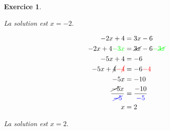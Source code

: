 \documentclass[10pt]{article}
\newtheorem{exo}{Exercice}
\begin{document}
\begin{exo}
\begin{multicols}{5}
La solution est $x=-2.$

 \columnbreak
 
 \begin{align*}
-2x+4&=3x-6\\
-2x+4\textcolor{green}{-3x}&=\cancel{3x}-6\textcolor{green}{-\cancel{3x}}\\
-5x+4&=-6\\
-5x+\cancel{4}\textcolor{red}{-\cancel{4}}&=-6\textcolor{red}{-4}\\
-5x&=-10\\
\frac{\cancel{-5}x}{\textcolor{blue}{\cancel{-5}}}&=\frac{-10}{\textcolor{blue}{-5}}\\
x&=2
\end{align*}

La solution est $x=2.$

\end{multicols}

\end{exo}
\end{document}
